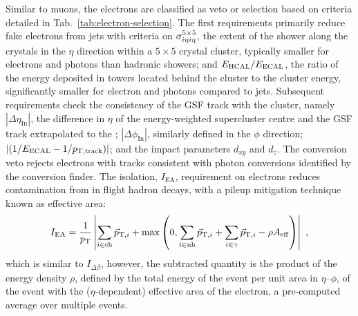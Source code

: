 Similar to muons, the electrons are classified as veto or selection based on
criteria detailed in Tab.~\ref{tab:electron-selection}. The first requirements
primarily reduce fake electrons from jets with criteria on $\sigma_{i\eta i\eta}^{5\times 5}$, the
extent of the shower along the \ECAL crystals in the $\eta$ direction within a
$5\times 5$ crystal cluster, typically smaller for electrons and photons than
hadronic showers; and $E_{\mathrm{HCAL}}/E_{\mathrm{ECAL}}$, the ratio
of the energy deposited in \HCAL towers located behind the \ECAL cluster to
the \ECAL cluster energy, significantly smaller for electron and photons
compared to jets. Subsequent requirements check the consistency of the GSF
track with the \ECAL cluster, namely $|\Delta\eta_{\mathrm{In}}|$, the
difference in $\eta$ of the energy-weighted supercluster centre and the GSF
track extrapolated to the \ECAL; $|\Delta\phi_{\mathrm{In}}|$, similarly
defined in the $\phi$ direction; $|(1/E_{\mathrm{ECAL}} -
1/p_{\mathrm{T,track}})|$; and the impact parameters $d_{xy}$ and $d_{z}$. The
conversion veto rejects electrons with tracks consistent with photon
conversions identified by the conversion finder. The isolation,
$I_{\mathrm{EA}}$, requirement on electrons reduces contamination from in
flight hadron decays, with a pileup mitigation technique known as effective
area:
%
\begin{equation}
    I_{\mathrm{EA}} = \frac{1}{p_{\text{T}}} \left| \sum_{i\in\mathrm{ch}} \vec{p}_{\mathrm{T},i} + \max\left(0, \sum_{i\in\mathrm{nh}}\vec{p}_{\mathrm{T},i} + \sum_{i\in\gamma}\vec{p}_{\mathrm{T},i} - \rho A_{\mathrm{eff}}\right) \right|\ ,
\end{equation}
%
which is similar to $I_{\Delta\beta}$, however, the subtracted quantity is the product of the energy density $\rho$, defined by the total energy of the event per unit area in $\eta$--$\phi$, of the event with the ($\eta$-dependent) effective area of the electron, a pre-computed average over multiple events.

